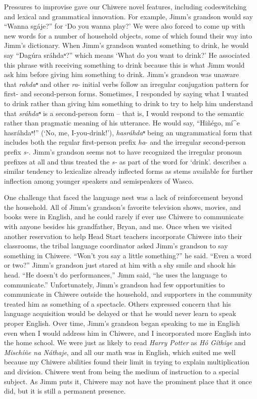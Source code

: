 \documentclass[output=paper]{LSP/langsci}
\begin{document}
Pressures to improvise gave our Chiwere novel features, including codeswitching and lexical and grammatical innovation. For example, Jimm's grandson would say ``Wanna sgáje?'' for `Do you wanna play?' We were also forced to come up with new words for a number of household objects, some of which found their way into Jimm's dictionary. When Jimm's grandson wanted something to drink, he would say ``Dagúra sráhdaⁿ?'' which means `What do you want to drink?' He associated this phrase with receiving something to drink because this is what Jimm would ask him before giving him something to drink. Jimm's grandson was unaware that \emph{rahdaⁿ} and other \emph{ra}- initial verbs follow an irregular conjugation pattern for first- and second-person forms. Sometimes, I responded by saying what I wanted to drink rather than giving him something to drink to try to help him understand that \emph{sráhdaⁿ} is a second-person form -- that is, I would respond to the semantic rather than pragmatic meaning of his utterance. He would say, ``Hiñégo, mí\^{ }e hasráhdaⁿ!'' (`No, me, I-you-drink!'), \emph{hasráhdaⁿ} being an ungrammatical form that includes both the regular first-person prefix \emph{ha}- and the irregular second-person prefix \emph{s-}. Jimm's grandson seems not to have recognized the irregular pronoun prefixes at all and thus treated the \emph{s-} as part of the word for `drink'.  describes a similar tendency to lexicalize already inflected forms as stems available for further inflection among younger speakers and semispeakers of Wasco. 

One challenge that faced the language nest was a lack of reinforcement beyond the household. All of Jimm's grandson's favorite television shows, movies, and books were in English, and he could rarely if ever use Chiwere to communicate with anyone besides his grandfather, Bryan, and me. Once when we visited another reservation to help Head Start teachers incorporate Chiwere into their classrooms, the tribal language coordinator asked Jimm's grandson to say something in Chiwere. ``Won't you say a little something?'' he said. ``Even a word or two?'' Jimm's grandson just stared at him with a shy smile and shook his head. ``He doesn't do performances,'' Jimm said, ``he uses the language to communicate.'' Unfortunately, Jimm's grandson had few opportunities to communicate in Chiwere outside the household, and supporters in the community treated him as something of a spectacle. Others expressed concern that his language acquisition would be delayed or that he would never learn to speak proper English. Over time, Jimm's grandson began speaking to me in English even when I would address him in Chiwere, and I incorporated more English into the home school. We were just as likely to read \emph{Harry Potter} as \emph{Hó Gíthige} and \emph{Mischíñe na Náthaje}, and all our math was in English, which suited me well because my Chiwere abilities found their limit in trying to explain multiplication and division. Chiwere went from being the medium of instruction to a special subject. As Jimm puts it, Chiwere may not have the prominent place that it once did, but it is still a permanent presence.
\end{document}
